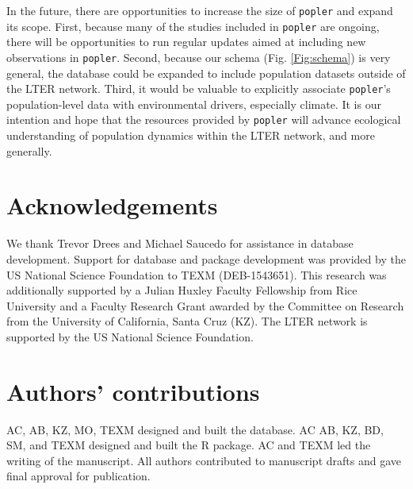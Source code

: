 \documentclass{article}\usepackage[]{graphicx}\usepackage[]{color}
\begin{document}
In the future, there are opportunities to increase the size of \texttt{popler} and expand its scope. First, because many of the studies included in \texttt{popler} are ongoing, there will be opportunities to run regular updates aimed at including new observations in \texttt{popler}. Second, because our schema (Fig. \ref{Fig:schema}) is very general, the database could be expanded to include population datasets outside of the LTER network. Third, it would be valuable to explicitly associate \texttt{popler}'s population-level data with environmental drivers, especially climate. It is our intention and hope that the resources provided by \texttt{popler} will advance ecological understanding of population dynamics within the LTER network, and more generally.

\section*{Acknowledgements}
We thank Trevor Drees and Michael Saucedo for assistance in database development. Support for database and package development was provided by the US National Science Foundation to TEXM (DEB-1543651). This research was additionally supported by a Julian Huxley Faculty Fellowship from Rice University and a Faculty Research Grant awarded by the Committee on Research from the University of California, Santa Cruz (KZ). The LTER network is supported by the US National Science Foundation.

\section*{Authors' contributions}
AC, AB, KZ, MO, TEXM designed and built the database. AC AB, KZ, BD, SM, and TEXM designed and built the R package. AC and TEXM led the writing of the manuscript. All authors contributed to manuscript drafts and gave final approval for publication.


\end{document}
